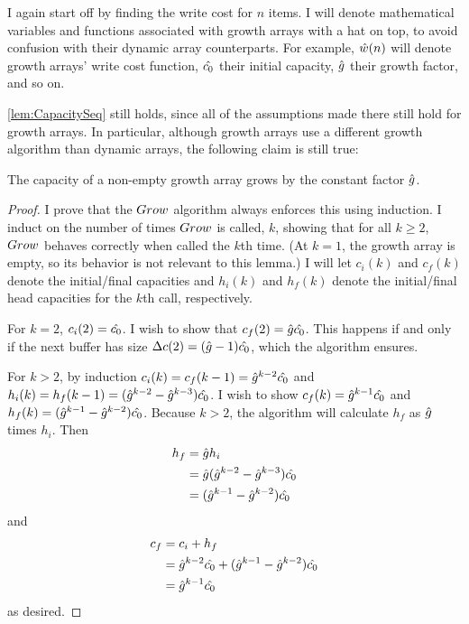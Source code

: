 \HdrGrowthArrayImpl

\HdrTimeComplex

I again start off by finding the write cost for $n$ items. I will denote mathematical variables and functions associated with growth arrays with a hat on top, to avoid confusion with their dynamic array counterparts. For example, $\hat{w}(n)$ will denote growth arrays' write cost function, $\hat{c_0}$ their initial capacity, $\hat{g}$ their growth factor, and so on.

\ref{lem:CapacitySeq} still holds, since all of the assumptions made there still hold for growth arrays. In particular, although growth arrays use a different growth algorithm than dynamic arrays, the following claim is still true:

\begin{lemma}
	The capacity of a non-empty growth array grows by the constant factor $\hat{g}$.
\end{lemma}

\begin{proof}
	I prove that the $Grow$ algorithm always enforces this using induction. I induct on the number of times $Grow$ is called, $k$, showing that for all $k \geq 2$, $Grow$ behaves correctly when called the $k$th time. (At $k = 1$, the growth array is empty, so its behavior is not relevant to this lemma.) I will let $c_i(k)$ and $c_f(k)$ denote the initial/final capacities and $h_i(k)$ and $h_f(k)$ denote the initial/final head capacities for the $k$th call, respectively.

	For $k = 2$, $c_i(2) = \hat{c_0}$. I wish to show that $c_f(2) = \hat{g}\hat{c_0}$. This happens if and only if the next buffer has size ${\Delta c}(2) = (\hat{g} - 1)\hat{c_0}$, which the algorithm ensures.
	
	For $k > 2$, by induction $c_i(k) = c_f(k - 1) = \hat{g}^{k - 2}\hat{c_0}$ and $h_i(k) = h_f(k - 1) = (\hat{g}^{k - 2} - \hat{g}^{k - 3})\hat{c_0}$. I wish to show $c_f(k) = \hat{g}^{k - 1}\hat{c_0}$ and $h_f(k) = (\hat{g}^{k - 1} - \hat{g}^{k - 2})\hat{c_0}$. Because $k > 2$, the algorithm will calculate $h_f$ as $\hat{g}$ times $h_i$. Then
	\begin{align*}
	h_f &= \hat{g} h_i\\
	&= \hat{g} (\hat{g}^{k - 2} - \hat{g}^{k - 3})\hat{c_0}\\
	&= (\hat{g}^{k - 1} - \hat{g}^{k - 2})\hat{c_0}
	\end{align*}
	and
	\begin{align*}
	c_f &= c_i + h_f\\
	&= \hat{g}^{k - 2}\hat{c_0} + (\hat{g}^{k - 1} - \hat{g}^{k - 2})\hat{c_0}\\
	&= \hat{g}^{k - 1}\hat{c_0}
	\end{align*}
	as desired.
\end{proof}

